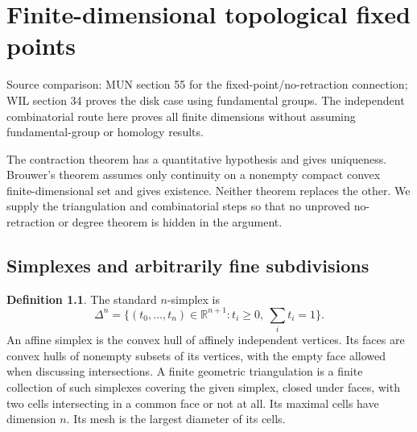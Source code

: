 \documentclass[11pt,oneside,openany]{book}
\theoremstyle{definition}
\newtheorem{definition}[theorem]{Definition}
\theoremstyle{remark}
\newcommand{\R}{\mathbb R}\newcommand{\C}{\mathbb C}
\newcommand{\source}[1]{\par\begingroup\small\sffamily\color{black!65}Source comparison: #1\par\endgroup}
\begin{document}


\chapter{Finite-dimensional topological fixed points}
\label{ch:d10-17}
\source{MUN section 55 for the fixed-point/no-retraction connection; WIL section 34 proves the disk case using fundamental groups. The independent combinatorial route here proves all finite dimensions without assuming fundamental-group or homology results.}

The contraction theorem has a quantitative hypothesis and gives uniqueness.
Brouwer's theorem assumes only continuity on a nonempty compact convex
finite-dimensional set and gives existence. Neither theorem replaces the other.
We supply the triangulation and combinatorial steps so that no unproved
no-retraction or degree theorem is hidden in the argument.

\section{Simplexes and arbitrarily fine subdivisions}
\begin{definition}\label{d10:17:simplex}
The standard $n$-simplex is
\[
 \Delta^n=\{(t_0,\ldots,t_n)\in\R^{n+1}:t_i\geq0,\
                                    \textstyle\sum_i t_i=1\}.
\]
An affine simplex is the convex hull of affinely independent vertices.
Its faces are convex hulls of nonempty subsets of its vertices, with the
empty face allowed when discussing intersections. A finite geometric
triangulation is a finite collection of such simplexes covering the
given simplex, closed under faces, with two cells intersecting in a common
face or not at all. Its maximal cells have dimension $n$.
Its mesh is the largest diameter of its cells.
\end{definition}
\end{document}
